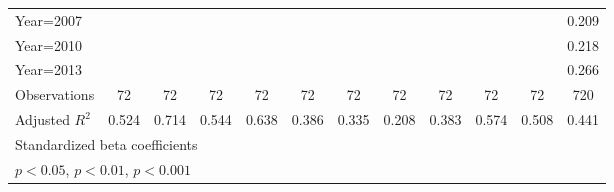 \begin{table}[htbp]
\begin{tabular}{l*{11}{c}}
Year=2007           &                     &                     &                     &                     &                     &                     &                     &                     &                     &                     &       0.209\sym{***}\\
Year=2010           &                     &                     &                     &                     &                     &                     &                     &                     &                     &                     &       0.218\sym{***}\\
Year=2013           &                     &                     &                     &                     &                     &                     &                     &                     &                     &                     &       0.266\sym{***}\\
\hline
Observations        &          72         &          72         &          72         &          72         &          72         &          72         &          72         &          72         &          72         &          72         &         720         \\
Adjusted \(R^{2}\)  &       0.524         &       0.714         &       0.544         &       0.638         &       0.386         &       0.335         &       0.208         &       0.383         &       0.574         &       0.508         &       0.441         \\
\hline\hline
\multicolumn{12}{l}{\footnotesize Standardized beta coefficients}\\
\multicolumn{12}{l}{\footnotesize \sym{*} \(p<0.05\), \sym{**} \(p<0.01\), \sym{***} \(p<0.001\)}\\
\end{tabular}
\end{table}
